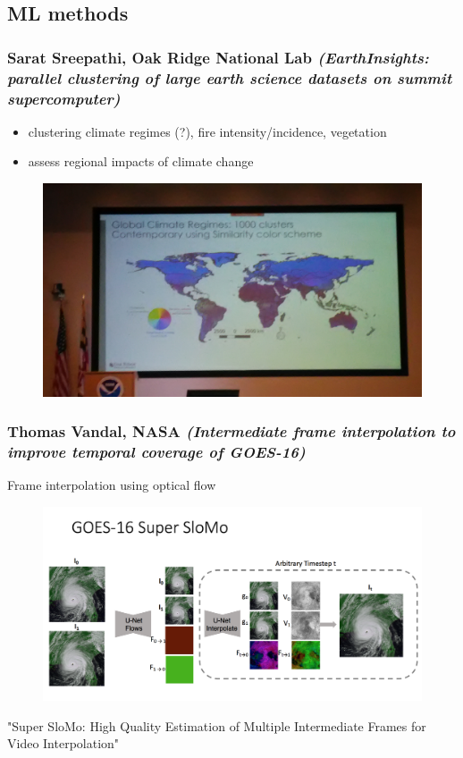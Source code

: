 \documentclass{beamer}
\begin{document}
\subsection{ML methods}
\begin{frame}
\frametitle{Sarat Sreepathi, Oak Ridge National Lab
 \textit{(EarthInsights: parallel clustering of large earth science datasets on summit supercomputer)}}
 \begin{itemize}
\item clustering climate regimes (?), fire intensity/incidence, vegetation
\item assess regional impacts of climate change
\end{itemize}
\begin{figure}
	\includegraphics[width=.8\linewidth]{figs/P_20190424_104512.jpg}
\end{figure}
\end{frame}

\begin{frame}
\frametitle{Thomas Vandal, NASA \textit{(Intermediate frame interpolation to improve temporal coverage of GOES-16)}}
Frame interpolation using optical flow
\begin{figure}
	\includegraphics[width=.8\linewidth]{figs/ScreenShot_SloMo.png}
\end{figure}
"Super SloMo: High Quality Estimation of Multiple Intermediate Frames
for Video Interpolation"
\end{frame}
\end{document}
